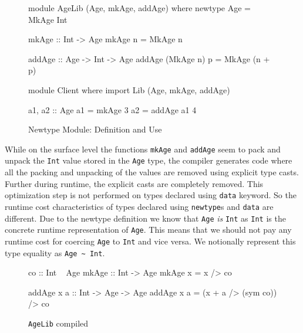 \documentclass[manuscript,screen,nonacm]{acmart}
\begin{document}
\begin{figure}[ht]
  \centering
  \begin{minipage}[ht]{0.5\linewidth}
    \begin{code}
      module AgeLib (Age, mkAge, addAge) where
      newtype Age = MkAge Int

      mkAge :: Int -> Age
      mkAge n = MkAge n

      addAge :: Age -> Int -> Age
      addAge (MkAge n) p = MkAge (n + p)
    \end{code}
  \end{minipage}%
  \begin{minipage}[ht]{0.4\linewidth}
    \begin{code}
      module Client where
      import Lib (Age, mkAge, addAge)

      a1, a2 :: Age
      a1 = mkAge 3
      a2 = addAge a1 4


    \end{code}
  \end{minipage}
  \caption{Newtype Module: Definition and Use}
  \label{fig:newtype-modules}
\end{figure}
While on the surface level the functions \lstinline{mkAge} and \lstinline{addAge} seem to pack and unpack
the \lstinline{Int} value stored in the \lstinline{Age} type, the compiler generates code where all the packing and unpacking of the values are removed using explicit type casts. Further during runtime, the explicit casts are completely removed. This optimization step is not performed on types declared using \lstinline{data} keyword. So the runtime cost characteristics of types declared using  \lstinline{newtype}s and \lstinline{data} are different. Due to the newtype definition
we know that \lstinline{Age} \emph{is} \lstinline{Int} as \lstinline{Int} is the concrete runtime representation of \lstinline{Age}. This means that we should not pay any runtime cost for coercing \lstinline{Age} to \lstinline{Int} and vice versa. We notionally represent this type equality as \lstinline{Age ~ Int}.
\begin{figure}[ht]
  \centering
  \begin{minipage}[h]{0.4\linewidth}
    \begin{code}
      co :: Int ~ Age
      mkAge :: Int -> Age
      mkAge x = x /> co
    \end{code}
  \end{minipage}%
  \begin{minipage}[ht]{0.4\linewidth}
    \begin{code}
      addAge x a :: Int -> Age -> Age
      addAge x a = (x + a /> (sym co)) /> co
    \end{code}
  \end{minipage}
  \caption{\lstinline{AgeLib} compiled}
  \label{fig:compiled-code}
\end{figure}
\end{document}
